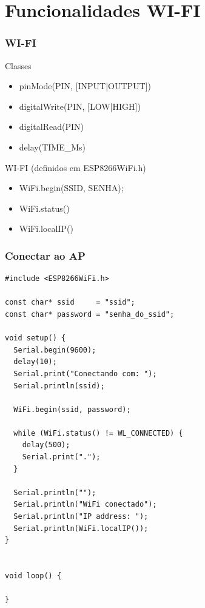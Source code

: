 \documentclass{beamer}
\begin{document}
\section{Funcionalidades WI-FI}

\begin{frame}[fragile]
\frametitle{WI-FI}

Classes
\begin{itemize}
\item pinMode(PIN, [INPUT|OUTPUT])
\item digitalWrite(PIN, [LOW|HIGH])
\item digitalRead(PIN)
\item delay(TIME\_Ms)
\end{itemize}

WI-FI (definidos em ESP8266WiFi.h)
\begin{itemize}
\item WiFi.begin(SSID, SENHA);
\item WiFi.status()
\item WiFi.localIP()
\end{itemize}

\end{frame}

\begin{frame}[fragile]
\frametitle{Conectar ao AP}

\tiny
\begin{lstlisting}
#include <ESP8266WiFi.h>

const char* ssid     = "ssid";
const char* password = "senha_do_ssid";

void setup() {
  Serial.begin(9600);
  delay(10);
  Serial.print("Conectando com: ");
  Serial.println(ssid);
 
  WiFi.begin(ssid, password);

  while (WiFi.status() != WL_CONNECTED) {
    delay(500);
    Serial.print(".");
  }

  Serial.println("");
  Serial.println("WiFi conectado");  
  Serial.println("IP address: ");
  Serial.println(WiFi.localIP());
}


void loop() {

}
\end{lstlisting}

\end{frame}
\end{document}
